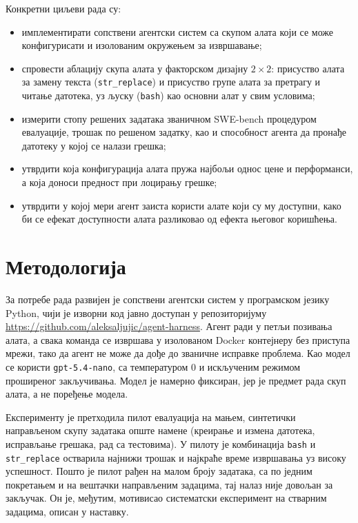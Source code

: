 \documentclass[12pt,a4paper]{report}
\begin{document}
	Конкретни циљеви рада су:
	\begin{itemize}
		\item имплементирати сопствени агентски систем са скупом алата који се
		може конфигурисати и изолованим окружењем за извршавање;
		\item спровести аблацију скупа алата у факторском дизајну $2 \times 2$:
		присуство алата за замену текста (\texttt{str\_replace}) и присуство
		групе алата за претрагу и читање датотека, уз љуску (\texttt{bash}) као
		основни алат у свим условима;
		\item измерити стопу решених задатака званичном SWE-bench процедуром
		евалуације, трошак по решеном задатку, као и способност агента да
		пронађе датотеку у којој се налази грешка;
		\item утврдити која конфигурација алата пружа најбољи однос цене и
		перформанси, а која доноси предност при лоцирању грешке;
		\item утврдити у којој мери агент заиста користи алате који су му
		доступни, како би се ефекат доступности алата разликовао од ефекта
		његовог коришћења.
	\end{itemize}

	\section{Методологија}

	За потребе рада развијен је сопствени агентски систем у програмском језику
	Python, чији је изворни код јавно доступан у репозиторијуму
	\url{https://github.com/aleksaljujic/agent-harness}. Агент ради у петљи позивања алата, а свака команда се извршава у
	изолованом Docker контејнеру без приступа мрежи, тако да агент не може да
	дође до званичне исправке проблема. Као модел се користи \texttt{gpt-5.4-nano},
	са температуром 0 и искљученим режимом проширеног закључивања. Модел је
	намерно фиксиран, јер је предмет рада скуп алата, а не поређење модела.

	Експерименту је претходила пилот евалуација на мањем, синтетички
	направљеном скупу задатака опште намене (креирање и измена датотека,
	исправљање грешака, рад са тестовима). У пилоту је комбинација
	\texttt{bash} и \texttt{str\_replace} остварила најнижи трошак и најкраће
	време извршавања уз високу успешност. Пошто је пилот рађен на малом броју
	задатака, са по једним покретањем и на вештачки направљеним задацима, тај
	налаз није довољан за закључак. Он је, међутим, мотивисао систематски
	експеримент на стварним задацима, описан у наставку.
\end{document}
